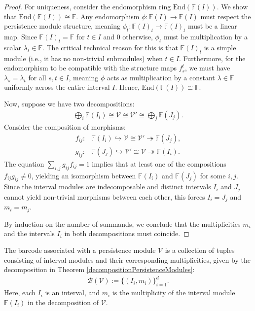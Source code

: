 \begin{proof}
For uniqueness, consider the endomorphism ring $\text{End}(\mathbb{F}(I))$. We show that $\text{End}(\mathbb{F}(I)) \cong \mathbb{F}$. Any endomorphism $\phi: \mathbb{F}(I) \to \mathbb{F}(I)$ must respect the persistence module structure, meaning $\phi_t: \mathbb{F}(I)_t \to \mathbb{F}(I)_t$ must be a linear map. Since $\mathbb{F}(I)_t = \mathbb{F}$ for $t \in I$ and $0$ otherwise, $\phi_t$ must be multiplication by a scalar $\lambda_t \in \mathbb{F}$. The critical technical reason for this is that $\mathbb{F}(I)_t$ is a simple module (i.e., it has no non-trivial submodules) when $t \in I$. Furthermore, for the endomorphism to be compatible with the structure maps $f_{s}^t$, we must have $\lambda_s = \lambda_t$ for all $s, t \in I$, meaning $\phi$ acts as multiplication by a constant $\lambda \in \mathbb{F}$ uniformly across the entire interval $I$. Hence, $\text{End}(\mathbb{F}(I)) \cong \mathbb{F}$.

Now, suppose we have two decompositions:
\begin{align}
	\bigoplus_i \mathbb{F}(I_i) \cong \mathcal{V} \cong \mathcal{V}' \cong \bigoplus_j \mathbb{F}(J_j).
\end{align}
Consider the composition of morphisms:
\begin{align}
	f_{ij}: &\mathbb{F}(I_i) \hookrightarrow \mathcal{V} \cong \mathcal{V}' \twoheadrightarrow \mathbb{F}(J_j),\\
	g_{ij}: &\mathbb{F}(J_j) \hookrightarrow \mathcal{V}' \cong \mathcal{V} \twoheadrightarrow \mathbb{F}(I_i).
\end{align}
The equation $\sum_{i,j} g_{ij}f_{ij} = 1$ implies that at least one of the compositions $f_{ij}g_{ij} \neq 0$, yielding an isomorphism between $\mathbb{F}(I_i)$ and $\mathbb{F}(J_j)$ for some $i, j$. Since the interval modules are indecomposable and distinct intervals $I_i$ and $J_j$ cannot yield non-trivial morphisms between each other, this forces $I_i = J_j$ and $m_i = m_j$. 

By induction on the number of summands, we conclude that the multiplicities $m_i$ and the intervals $I_i$ in both decompositions must coincide.
\end{proof}

\begin{definition}
The barcode associated with a persistence module $\mathcal{V}$ is a collection of tuples consisting of interval modules and their corresponding multiplicities, given by the decomposition in Theorem \ref{decompositionPersistenceModules}:
\begin{align}
	\mathcal{B}(\mathcal{V}) := \{(I_i, m_i)\}_{i=1}^d.
\end{align}
Here, each $I_i$ is an interval, and $m_i$ is the multiplicity of the interval module $\mathbb{F}(I_i)$ in the decomposition of $\mathcal{V}$.
\end{definition}

